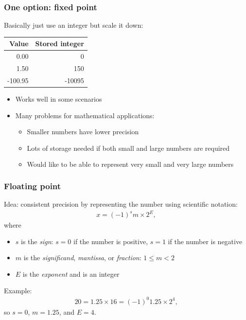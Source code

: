 \documentclass[aspectratio=169,hyperref={bookmarks=false,urlcolor=blue,colorlinks=true},10pt]{beamer}
\begin{document}
\begin{frame}
  \frametitle{One option: fixed point}

  Basically just use an integer but scale it down:

  \begin{table}
    \begin{tabular}{r|r}
      Value & Stored integer\\
      \hline
      0.00 & 0\\
      1.50 & 150\\
      -100.95 & -10095
    \end{tabular}
  \end{table}

  \vspace{\baselineskip}

  \begin{itemize}
  \item Works well in some scenarios
  \item Many problems for mathematical applications:
    \begin{itemize}
    \item Smaller numbers have lower precision
    \item Lots of storage needed if both small and large numbers are required
    \item Would like to be able to represent very small and very large numbers
    \end{itemize}
  \end{itemize}
\end{frame}

\begin{frame}
  \frametitle{Floating point}

  Idea: consistent precision by representing the number using scientific notation:
  \begin{align*}
    x = (-1)^s m \times 2^E,
  \end{align*}
  where
  \begin{itemize}
  \item $s$ is the \emph{sign}: $s=0$ if the number is positive, $s=1$ if the number is negative
  \item $m$ is the \emph{significand}, \emph{mantissa}, or \emph{fraction}: $1\leq m < 2$
  \item $E$ is the \emph{exponent} and is an integer
  \end{itemize}

  \vspace{\baselineskip}

  Example:
  \begin{align}
    20 = 1.25 \times 16 = (-1)^0 1.25 \times 2^4,
  \end{align}
  so $s=0$, $m=1.25$, and $E=4$.
\end{frame}
\end{document}
